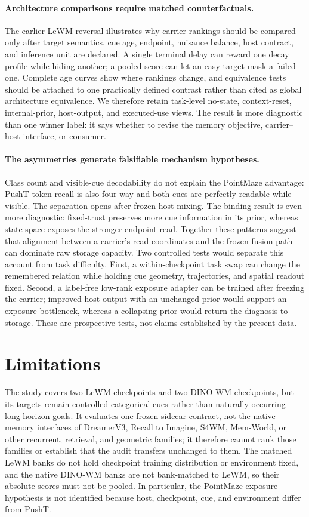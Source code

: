 \paragraph{Architecture comparisons require matched counterfactuals.}
The earlier LeWM reversal illustrates why carrier rankings should be compared
only after target semantics, cue age, endpoint, nuisance balance, host contract,
and inference unit are declared.  A single terminal delay can reward one decay
profile while hiding another; a pooled score can let an easy target mask a
failed one.  Complete age curves show where rankings change, and equivalence
tests should be attached to one practically defined contrast rather than cited
as global architecture equivalence.  We therefore retain task-level no-state,
context-reset, internal-prior, host-output, and executed-use views.  The result
is more diagnostic than one winner label: it says whether to revise the memory
objective, carrier--host interface, or consumer.

\paragraph{The asymmetries generate falsifiable mechanism hypotheses.}
Class count and visible-cue decodability do not explain the PointMaze advantage:
PushT token recall is also four-way and both cues are perfectly readable while
visible.  The separation opens after frozen host mixing.  The binding result is
even more diagnostic: fixed-trust preserves more cue information in its prior,
whereas state-space exposes the stronger endpoint read.  Together these patterns
suggest that alignment between a carrier's read coordinates and the frozen
fusion path can dominate raw storage capacity.  Two controlled tests would
separate this account from task difficulty.  First, a within-checkpoint task
swap can change the remembered relation while holding cue geometry,
trajectories, and spatial readout fixed.  Second, a label-free low-rank exposure
adapter can be trained after freezing the carrier; improved host output with an
unchanged prior would support an exposure bottleneck, whereas a collapsing
prior would return the diagnosis to storage.  These are prospective tests, not
claims established by the present data.

\section{Limitations}

The study covers two LeWM checkpoints and two DINO-WM checkpoints, but its
targets remain controlled categorical cues rather than naturally occurring
long-horizon goals.  It evaluates one frozen sidecar contract, not the native
memory interfaces of DreamerV3, Recall to Imagine, S4WM, Mem-World, or other
recurrent, retrieval, and geometric families; it therefore cannot rank those
families or establish that the audit transfers unchanged to them.  The matched
LeWM banks do not hold checkpoint training distribution or environment fixed,
and the native DINO-WM banks are not bank-matched to LeWM, so their absolute
scores must not be pooled.  In particular, the PointMaze exposure hypothesis
is not identified because host, checkpoint, cue, and environment differ from
PushT.

